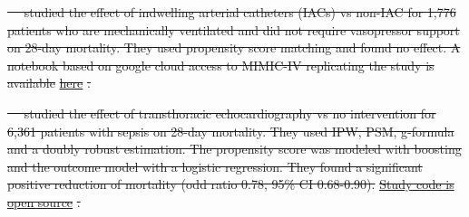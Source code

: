 \documentclass[10pt,letterpaper]{article}
\providecommand{\DIFdeltex}[1]{{\protect\color{red}\sout{#1}}}                      %
\providecommand{\DIFdelbegin}{} %
\providecommand{\DIFdelend}{} %
\providecommand{\DIFdel}[1]{\texorpdfstring{\DIFdeltex{#1}}{}} %
\newcommand{\DIFscaledelfig}{0.5}
\newlength{\DIFdelgraphicswidth} %
\newlength{\DIFdelgraphicsheight} %
\newcommand{\DIFdelincludegraphics}[2][]{%
\sbox{\DIFdelgraphicsbox}{\DIFOincludegraphics[#1]{#2}}%
\settoboxwidth{\DIFdelgraphicswidth}{\DIFdelgraphicsbox} %
\settoboxtotalheight{\DIFdelgraphicsheight}{\DIFdelgraphicsbox} %
\scalebox{\DIFscaledelfig}{%
\parbox[b]{\DIFdelgraphicswidth}{\usebox{\DIFdelgraphicsbox}\\[-\baselineskip] \rule{\DIFdelgraphicswidth}{0em}}\llap{\resizebox{\DIFdelgraphicswidth}{\DIFdelgraphicsheight}{%
\setlength{\unitlength}{\DIFdelgraphicswidth}%
\begin{picture}(1,1)%
\thicklines\linethickness{2pt} %
{\color[rgb]{1,0,0}\put(0,0){\framebox(1,1){}}}%
{\color[rgb]{1,0,0}\put(0,0){\line( 1,1){1}}}%
{\color[rgb]{1,0,0}\put(0,1){\line(1,-1){1}}}%
\end{picture}%
}\hspace*{3pt}}} %
} %
\DeclareRobustCommand{\DIFdelbegin}{\DIFOdelbegin \let\includegraphics\DIFdelincludegraphics} %
\DeclareRobustCommand{\DIFdelend}{\DIFOaddend \let\includegraphics\DIFOincludegraphics} %
\begin{document}
\DIFdelbegin %
\DIFdel{\mbox{%
\cite{hsu2015association} }\hskip0pt%
studied the effect of \textcolor{I}{indwelling
          arterial catheters (IACs)} vs \textcolor{C}{non-IAC} for
        \textcolor{P}{1,776 patients who are mechanically ventilated and did
          not require vasopressor support} on \textcolor{O}{28-day mortality}.
        They used propensity score matching and found no effect. A notebook based on google cloud access to MIMIC-IV
        replicating the study is available }\href{https://github.com/alistairewj/mimic-iv-aline-study/blob/main/mimic_iv_aline.ipynb}{\DIFdel{here}}%
\DIFdel{.
}\DIFdelend %

\DIFdelbegin %
\DIFdel{\mbox{%
\cite{feng2018transthoracic} }\hskip0pt%
studied the effect of
        \textcolor{I}{transthoracic echocardiography} vs \textcolor{C}{no
          intervention} for \textcolor{P}{6,361 patients with sepsis} on
        \textcolor{O}{28-day mortality}. They used IPW, PSM, g-formula and a
        doubly robust estimation. The propensity score was modeled with boosting
        and the outcome model with a logistic regression. They
        found a significant positive reduction of mortality (odd ratio 0.78, 95\% CI 0.68-0.90).
        }\href{https://github.com/nus-mornin-lab/echo-mimiciii}{\DIFdel{Study code is
          open source}}%
\DIFdel{.
}\DIFdelend %
\end{document}
